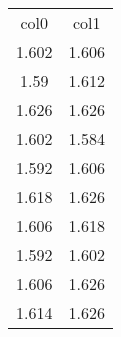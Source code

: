 \begin{table}
\begin{tabular}{cc}
col0 & col1 \\
1.602 & 1.606 \\
1.59 & 1.612 \\
1.626 & 1.626 \\
1.602 & 1.584 \\
1.592 & 1.606 \\
1.618 & 1.626 \\
1.606 & 1.618 \\
1.592 & 1.602 \\
1.606 & 1.626 \\
1.614 & 1.626 \\
\end{tabular}
\end{table}
